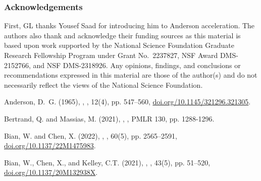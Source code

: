 \documentclass[11pt]{article}
\begin{document}
{%
\subsubsection*{Acknowledgements}
First, GL thanks Yousef Saad for introducing him to Anderson acceleration. The authors also thank and acknowledge their funding sources as this material is based upon work supported by the National Science Foundation Graduate Research
Fellowship Program under Grant No.~2237827, NSF Award DMS-2152766, and NSF DMS-2318926. 
Any opinions, findings, and conclusions or recommendations expressed in this material are those of the author(s) and do not necessarily reflect the views of the National Science Foundation. 

\begin{thebibliography}{}
 \setlength{\itemindent}{-\leftmargin}
 \makeatletter\renewcommand{\@biblabel}[1]{}\makeatother
 
Anderson, D.~G. (1965),
,
, 12(4), pp. 547–560, \href{https://doi.org/10.1145/321296.321305}{doi.org/10.1145/321296.321305}.


Bertrand, Q. and Massias, M. (2021),
,
, PMLR 130, pp. 1288-1296. 

Bian, W. and Chen, X. (2022),
,
, 
60(5), pp. 2565--2591,
\href{http://dx.doi.org/10.1137/22M1475983}{doi.org/10.1137/22M1475983}.

Bian, W., Chen, X., and Kelley, C.T. (2021),
,
, 
43(5), pp. 51--520,
\href{http://dx.doi.org/10.1137/20M132938X}{doi.org/10.1137/20M132938X}.


\end{thebibliography}}
\end{document}
